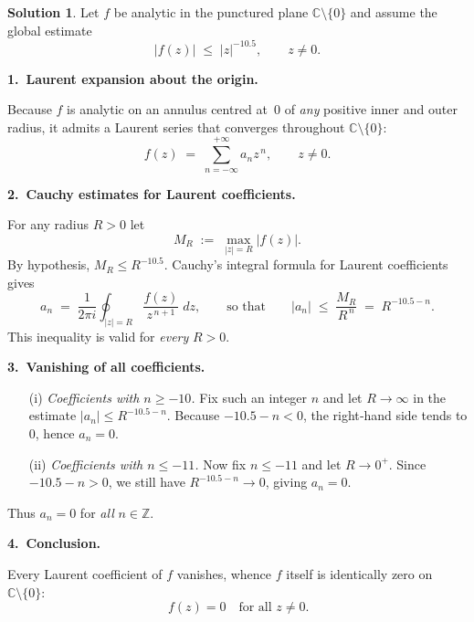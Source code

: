 \documentclass[12pt]{article}
\title{}
\author{Jerich Lee}
\date{\today}
\theoremstyle{definition} %
\newtheorem{solution}{Solution}
\theoremstyle{plain} %
\begin{document}
\maketitle
\begin{solution}
  Let $f$ be analytic in the punctured plane $\mathbb{C}\setminus\{0\}$ and
  assume the global estimate
  \[
     |f(z)| \;\le\; |z|^{-10.5},
     \qquad z\neq 0.
  \]
  
  \bigskip
  \textbf{1.\ Laurent expansion about the origin.}
  
  Because $f$ is analytic on an annulus centred at~$0$ of \emph{any} positive
  inner and outer radius, it admits a Laurent series that converges
  throughout $\mathbb{C}\setminus\{0\}$:
  \[
     f(z)
     \;=\;
     \sum_{n=-\infty}^{+\infty} a_n z^{\,n},
     \qquad z\neq 0.
  \]
  
  \bigskip
  \textbf{2.\ Cauchy estimates for Laurent coefficients.}
  
  For any radius $R>0$ let
  \[
     M_R \;:=\; \max_{|z|=R} |f(z)|.
  \]
  By hypothesis, $M_R\le R^{-10.5}$.  
  Cauchy’s integral formula for Laurent coefficients gives
  \[
     a_n
     \;=\;
     \frac{1}{2\pi i} \oint_{|z|=R} \frac{f(z)}{z^{\,n+1}}\;dz,
     \qquad\text{so that}\qquad
     |a_n|
     \;\le\;
     \frac{M_R}{R^{\,n}}
     \;=\;
     R^{-10.5-n}.
  \]
  This inequality is valid for \emph{every} $R>0$.
  
  \bigskip
  \textbf{3.\ Vanishing of all coefficients.}
  
  \begin{itemize}
    \item[(i)] \emph{Coefficients with $n\ge -10$.}\;
          Fix such an integer $n$ and let $R\to\infty$ in the estimate
          $|a_n|\le R^{-10.5-n}$.  Because $-10.5-n<0$, the right‑hand side
          tends to $0$, hence $a_n=0$.
  
    \item[(ii)] \emph{Coefficients with $n\le -11$.}\;
          Now fix $n\le-11$ and let $R\to 0^{+}$.  Since
          $-10.5-n>0$, we still have $R^{-10.5-n}\to 0$, giving $a_n=0$.
  \end{itemize}
  
  Thus $a_n=0$ for \emph{all} $n\in\mathbb{Z}$.
  
  \bigskip
  \textbf{4.\ Conclusion.}
  
  Every Laurent coefficient of $f$ vanishes, whence $f$ itself is
  identically zero on $\mathbb{C}\setminus\{0\}$:
  \[
     \boxed{\,f(z)=0\quad\text{for all }z\neq 0.}
  \]
  \end{solution}
\end{document}

